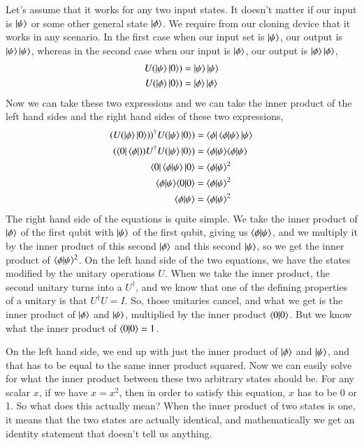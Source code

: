 Let's assume that it works for any two input states. It doesn't matter if our input is $\left| \psi \right\rangle$ or some other general state $\left| \phi \right\rangle$. We require from our cloning device that it works in any scenario. In the first case when our input set is $\left| \psi \right\rangle$, our output is $\left| \psi \right\rangle \left| \psi \right\rangle$, whereas in the second case when our input is $\left| \phi \right\rangle$, our output is $\left| \phi \right\rangle\left| \phi \right\rangle$,
\begin{equation}
\begin{aligned}
U(\left| \psi \right\rangle\left| 0 \right\rangle) &=\left| \psi \right\rangle\left| \psi \right\rangle \\
U(\left| \phi \right\rangle\left| 0 \right\rangle) &=\left| \phi \right\rangle\left| \phi \right\rangle
\end{aligned}
\end{equation}
Now we can take these two expressions and we can take the inner product of the left hand sides and the right hand sides of these two expressions,
\begin{equation}
\begin{aligned}
(U(\left| \phi \right\rangle\left| 0 \right\rangle))^{\dagger}U(\left| \psi \right\rangle\left| 0 \right\rangle) &= \left\langle \phi \right|\langle \phi|\psi \rangle\left| \psi \right\rangle \\
(\left\langle 0 \right|\left\langle \phi \right|))U^{\dagger}U(\left| \psi \right\rangle\left| 0 \right\rangle) &= \langle \phi|\psi \rangle\langle \phi|\psi \rangle \\
\left\langle 0 \right|\langle \phi|\psi \rangle\left| 0 \right\rangle &= \langle \phi|\psi \rangle^2\\
\langle \phi|\psi \rangle\langle 0|0 \rangle &= \langle \phi|\psi \rangle^2\\
\langle \phi|\psi \rangle &= \langle \phi|\psi \rangle^2
\end{aligned}
\end{equation}
The right hand side of the equations is quite simple. We take the inner product of $\left| \phi \right\rangle$ of the first qubit with $\left| \psi \right\rangle$ of the first qubit, giving us $\langle \phi|\psi \rangle$, and we multiply it by the inner product of this second $\left| \phi \right\rangle$ and this second $\left| \psi \right\rangle$, so we get the inner product of $\langle \phi|\psi \rangle^2$. On the left hand side of the two equations, we have the states modified by the unitary operations $U$.  When we take the inner product, the second unitary turns into a $U^\dagger$, and we know that one of the defining properties of a unitary is that $U^\dagger U = I$. So, those unitaries cancel, and what we get is the inner product of $\left| \phi \right\rangle$ and $\left| \psi \right\rangle$, multiplied by the inner product $\langle 0|0 \rangle$. But we know what the inner product of $\langle 0|0 \rangle = 1$.

On the left hand side, we end up with just the inner product of $\left| \phi \right\rangle$ and $\left| \psi \right\rangle$, and that has to be equal to the same inner product squared. Now we can easily solve for what the inner product between these two arbitrary states should be. For any scalar $x$, if we have $x = x^2$, then in order to satisfy this equation, $x$ has to be 0 or 1. So what does this actually mean? When the inner product of two states is one, it means that the two states are actually identical, and mathematically we get an identity statement that doesn't tell us anything.

